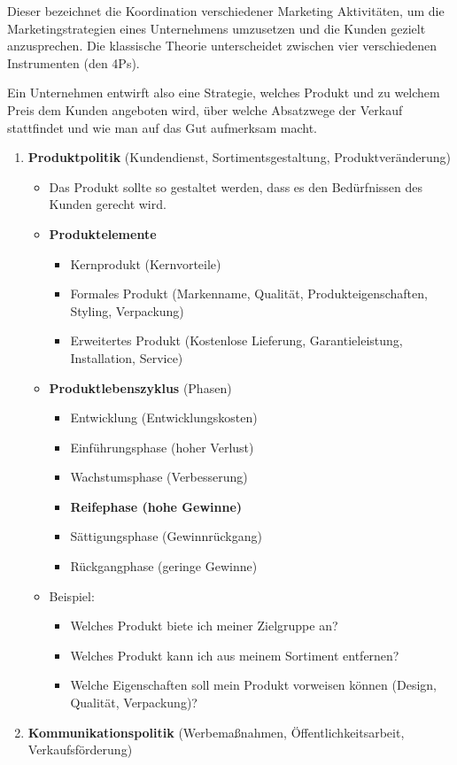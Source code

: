 Dieser bezeichnet die Koordination verschiedener Marketing Aktivitäten,
um die Marketingstrategien eines Unternehmens umzusetzen und die Kunden
gezielt anzusprechen. Die klassische Theorie unterscheidet zwischen vier
verschiedenen Instrumenten (den 4Ps).

Ein Unternehmen entwirft also eine Strategie, welches Produkt und zu
welchem Preis dem Kunden angeboten wird, über welche Absatzwege der
Verkauf stattfindet und wie man auf das Gut aufmerksam macht.

\begin{enumerate}
\item
  \textbf{Produktpolitik} (Kundendienst, Sortimentsgestaltung,
  Produktveränderung)

  \begin{itemize}
  \item
    Das Produkt sollte so gestaltet werden, dass es den Bedürfnissen des
    Kunden gerecht wird.
  \item
    \textbf{Produktelemente}

    \begin{itemize}
    \item
      Kernprodukt (Kernvorteile)
    \item
      Formales Produkt (Markenname, Qualität, Produkteigenschaften,
      Styling, Verpackung)
    \item
      Erweitertes Produkt (Kostenlose Lieferung, Garantieleistung,
      Installation, Service)
    \end{itemize}
  \item
    \textbf{Produktlebenszyklus} (Phasen)

    \begin{itemize}
    \item
      Entwicklung (Entwicklungskosten)
    \item
      Einführungsphase (hoher Verlust)
    \item
      Wachstumsphase (Verbesserung)
    \item
      \textbf{Reifephase (hohe Gewinne)}
    \item
      Sättigungsphase (Gewinnrückgang)
    \item
      Rückgangphase (geringe Gewinne)
    \end{itemize}
  \item
    Beispiel:

    \begin{itemize}
    \item
      Welches Produkt biete ich meiner Zielgruppe an?
    \item
      Welches Produkt kann ich aus meinem Sortiment entfernen?
    \item
      Welche Eigenschaften soll mein Produkt vorweisen können (Design,
      Qualität, Verpackung)?
    \end{itemize}
  \end{itemize}
\item
  \textbf{Kommunikationspolitik} (Werbemaßnahmen, Öffentlichkeitsarbeit,
  Verkaufsförderung)


\end{enumerate}
